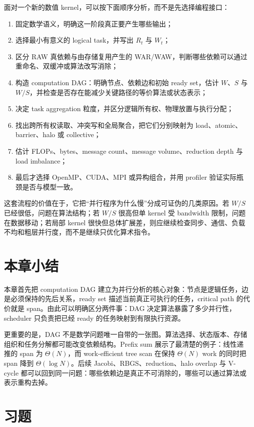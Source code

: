 面对一个新的数值 kernel，可以按下面顺序分析，而不是先选择编程接口：
\begin{enumerate}
\item 固定数学语义，明确这一阶段真正要产生哪些输出；
\item 选择最小有意义的 logical task，并写出 $R_t$ 与 $W_t$；
\item 区分 RAW 真依赖与由存储复用产生的 WAR/WAW，判断哪些依赖可以通过重命名、双缓冲或算法改写消除；
\item 构造 computation DAG：明确节点、依赖边和初始 ready set，估计 $W$、$S$ 与 $W/S$，并检查是否存在能减少关键路径的等价算法或状态表示；
\item 决定 task aggregation 粒度，并区分逻辑所有权、物理放置与执行分配；
\item 找出跨所有权读取、冲突写和全局聚合，把它们分别映射为 load、atomic、barrier、halo 或 collective；
\item 估计 FLOPs、bytes、message count、message volume、reduction depth 与 load imbalance；
\item 最后才选择 OpenMP、CUDA、MPI 或异构组合，并用 profiler 验证实际瓶颈是否与模型一致。
\end{enumerate}

这套流程的价值在于，它把“并行程序为什么慢”分成可证伪的几类原因。若 $W/S$ 已经很低，问题在算法结构；若 $W/S$ 很高但单 kernel 受 bandwidth 限制，问题在数据移动；若局部 kernel 很快但总体扩展差，则应继续检查同步、通信、负载不均和粗层并行度，而不是继续只优化算术指令。

\section{本章小结}

本章首先把 computation DAG 建立为并行分析的核心对象：节点是逻辑任务，边是必须保持的先后关系，ready set 描述当前真正可执行的任务，critical path 的代价就是 span。由此可以明确区分两件事：DAG 决定算法暴露了多少并行性，scheduler 只负责把已经 ready 的任务映射到有限执行资源。

更重要的是，DAG 不是数学问题唯一自带的一张图。算法选择、状态版本、存储组织和任务分解都可能改变依赖结构。Prefix sum 展示了最清楚的例子：线性递推的 span 为 $\Theta(N)$，而 work-efficient tree scan 在保持 $\Theta(N)$ work 的同时把 span 降到 $\Theta(\log N)$。后续 Jacobi、RBGS、reduction、halo overlap 与 V-cycle 都可以回到同一问题：哪些依赖边是真正不可消除的，哪些可以通过算法或表示重构去掉。

\section*{习题}

